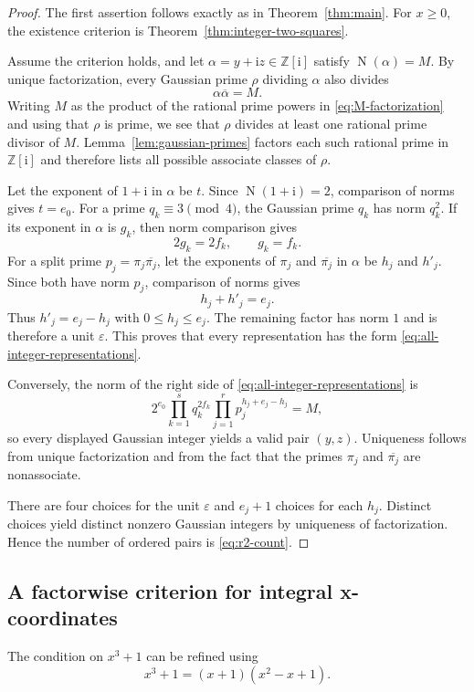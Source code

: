 \documentclass[11pt,a4paper]{article}
\numberwithin{equation}{section}
\theoremstyle{definition}
\newcommand{\Z}{\mathbb{Z}}
\newcommand{\N}{\operatorname{N}}
\newcommand{\conj}[1]{\overline{#1}}
\newcommand{\ii}{\mathrm{i}}
\begin{document}
\begin{proof}
The first assertion follows exactly as in Theorem~\ref{thm:main}. For $x\ge0$, the existence criterion is Theorem~\ref{thm:integer-two-squares}.

Assume the criterion holds, and let $\alpha=y+\ii z\in\Z[\ii]$ satisfy $\N(\alpha)=M$. By unique factorization, every Gaussian prime $\rho$ dividing $\alpha$ also divides
\[
 \alpha\conj{\alpha}=M.
\]
Writing $M$ as the product of the rational prime powers in \eqref{eq:M-factorization} and using that $\rho$ is prime, we see that $\rho$ divides at least one rational prime divisor of $M$. Lemma~\ref{lem:gaussian-primes} factors each such rational prime in $\Z[\ii]$ and therefore lists all possible associate classes of $\rho$.

Let the exponent of $1+\ii$ in $\alpha$ be $t$. Since $\N(1+\ii)=2$, comparison of norms gives $t=e_0$. For a prime $q_k\equiv3\pmod4$, the Gaussian prime $q_k$ has norm $q_k^2$. If its exponent in $\alpha$ is $g_k$, then norm comparison gives
\[
 2g_k=2f_k,
 \qquad
 g_k=f_k.
\]
For a split prime $p_j=\pi_j\conj{\pi_j}$, let the exponents of $\pi_j$ and $\conj{\pi_j}$ in $\alpha$ be $h_j$ and $h'_j$. Since both have norm $p_j$, comparison of norms gives
\[
 h_j+h'_j=e_j.
\]
Thus $h'_j=e_j-h_j$ with $0\le h_j\le e_j$. The remaining factor has norm $1$ and is therefore a unit $\varepsilon$. This proves that every representation has the form \eqref{eq:all-integer-representations}.

Conversely, the norm of the right side of \eqref{eq:all-integer-representations} is
\[
 2^{e_0}
 \prod_{k=1}^{s}q_k^{2f_k}
 \prod_{j=1}^{r}p_j^{h_j+e_j-h_j}
 =M,
\]
so every displayed Gaussian integer yields a valid pair $(y,z)$. Uniqueness follows from unique factorization and from the fact that the primes $\pi_j$ and $\conj{\pi_j}$ are nonassociate.

There are four choices for the unit $\varepsilon$ and $e_j+1$ choices for each $h_j$. Distinct choices yield distinct nonzero Gaussian integers by uniqueness of factorization. Hence the number of ordered pairs is \eqref{eq:r2-count}.
\end{proof}

\subsection{A factorwise criterion for integral x-coordinates}

The condition on $x^3+1$ can be refined using
\begin{equation}
 x^3+1=(x+1)(x^2-x+1).
 \label{eq:cubic-factorization}
\end{equation}
\end{document}
